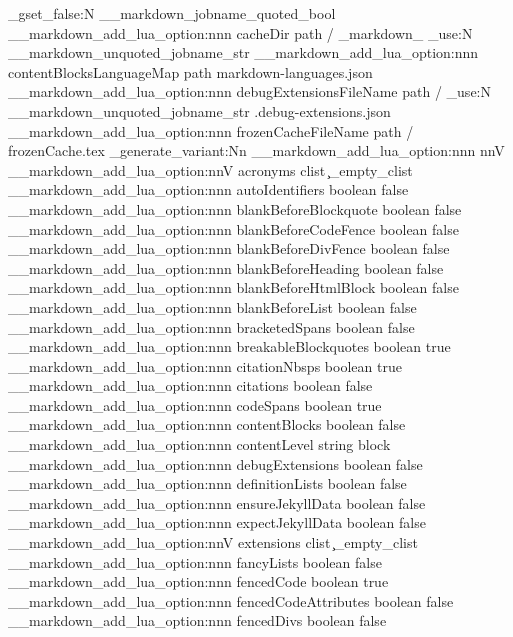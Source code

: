  {
    \bool_gset_false:N
      \g__markdown_jobname_quoted_bool
  }
\__markdown_add_lua_option:nnn
  { cacheDir }
  { path }
  {
    \markdownOptionOutputDir
    / _markdown_
    \str_use:N
      \g__markdown_unquoted_jobname_str
  }
\__markdown_add_lua_option:nnn
  { contentBlocksLanguageMap }
  { path }
  { markdown-languages.json }
\__markdown_add_lua_option:nnn
  { debugExtensionsFileName }
  { path }
  {
    \markdownOptionOutputDir
    /
    \str_use:N
      \g__markdown_unquoted_jobname_str
    .debug-extensions.json
  }
\__markdown_add_lua_option:nnn
  { frozenCacheFileName }
  { path }
  { \markdownOptionCacheDir / frozenCache.tex }
\cs_generate_variant:Nn
  \__markdown_add_lua_option:nnn
  { nnV }
\__markdown_add_lua_option:nnV
  { acronyms }
  { clist }
  \c_empty_clist
\__markdown_add_lua_option:nnn
  { autoIdentifiers }
  { boolean }
  { false }
\__markdown_add_lua_option:nnn
  { blankBeforeBlockquote }
  { boolean }
  { false }
\__markdown_add_lua_option:nnn
  { blankBeforeCodeFence }
  { boolean }
  { false }
\__markdown_add_lua_option:nnn
  { blankBeforeDivFence }
  { boolean }
  { false }
\__markdown_add_lua_option:nnn
  { blankBeforeHeading }
  { boolean }
  { false }
\__markdown_add_lua_option:nnn
  { blankBeforeHtmlBlock }
  { boolean }
  { false }
\__markdown_add_lua_option:nnn
  { blankBeforeList }
  { boolean }
  { false }
\__markdown_add_lua_option:nnn
  { bracketedSpans }
  { boolean }
  { false }
\__markdown_add_lua_option:nnn
  { breakableBlockquotes }
  { boolean }
  { true }
\__markdown_add_lua_option:nnn
  { citationNbsps }
  { boolean }
  { true }
\__markdown_add_lua_option:nnn
  { citations }
  { boolean }
  { false }
\__markdown_add_lua_option:nnn
  { codeSpans }
  { boolean }
  { true }
\__markdown_add_lua_option:nnn
  { contentBlocks }
  { boolean }
  { false }
\__markdown_add_lua_option:nnn
  { contentLevel }
  { string }
  { block }
\__markdown_add_lua_option:nnn
  { debugExtensions }
  { boolean }
  { false }
\__markdown_add_lua_option:nnn
  { definitionLists }
  { boolean }
  { false }
\__markdown_add_lua_option:nnn
  { ensureJekyllData }
  { boolean }
  { false }
\__markdown_add_lua_option:nnn
  { expectJekyllData }
  { boolean }
  { false }
\__markdown_add_lua_option:nnV
  { extensions }
  { clist }
  \c_empty_clist
\__markdown_add_lua_option:nnn
  { fancyLists }
  { boolean }
  { false }
\__markdown_add_lua_option:nnn
  { fencedCode }
  { boolean }
  { true }
\__markdown_add_lua_option:nnn
  { fencedCodeAttributes }
  { boolean }
  { false }
\__markdown_add_lua_option:nnn
  { fencedDivs }
  { boolean }
  { false }
